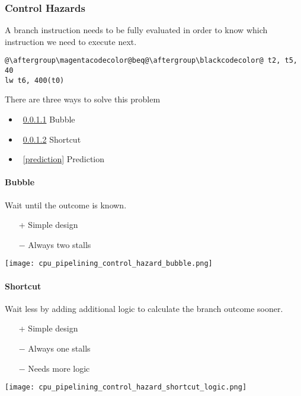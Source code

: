 \begin{multicols*}{3}
    \subsubsection{Control Hazards}\label{control hazards}

    A branch instruction needs to be fully evaluated in order to know which instruction we need to execute next.

    \begin{lstlisting}[escapechar=@]
@\aftergroup\magentacodecolor@beq@\aftergroup\blackcodecolor@ t2, t5, 40
lw t6, 400(t0)
\end{lstlisting}

    There are three ways to solve this problem
    \begin{itemize}
        \item~\ref{bubble} Bubble
        \item~\ref{shortcut} Shortcut
        \item~\ref{prediction} Prediction
    \end{itemize}

    \paragraph{Bubble}\label{bubble}

    Wait until the outcome is known.
    \begin{itemize}
        \item[+] Simple design
        \item[$-$] Always two stalls
    \end{itemize}

    \texttt{[image: cpu\_pipelining\_control\_hazard\_bubble.png]}

    \paragraph{Shortcut}\label{shortcut}

    Wait less by adding additional logic to calculate the branch outcome sooner.

    \begin{itemize}
        \item[+] Simple design
        \item[$-$] Always one stalls
        \item[$-$] Needs more logic
    \end{itemize}

    \texttt{[image: cpu\_pipelining\_control\_hazard\_shortcut\_logic.png]}


\end{multicols*}
